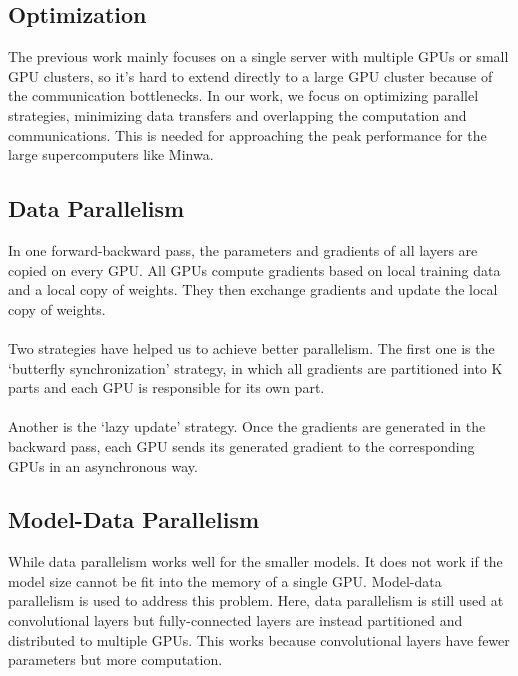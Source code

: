 \documentclass[12pt,letterpaper, onecolumn]{exam}
\begin{document}
    \subsection{Optimization }
    The previous work mainly focuses on a single server with multiple GPUs or small GPU clusters, so it's hard to extend directly to a large GPU cluster because of the communication bottlenecks. In our work, we focus on optimizing parallel strategies, minimizing data transfers and overlapping the computation and communications. This is needed for approaching the peak performance for the large supercomputers like Minwa. 
    
    \subsection{Data Parallelism}
    In one forward-backward pass, the parameters and gradients of all layers are copied on every GPU. All GPUs compute gradients based on local training data and a local copy of weights. They then exchange gradients and update the local copy of weights.\\
    \\
    Two strategies have helped us to achieve better parallelism. The first one is the ‘butterfly synchronization’ strategy, in which all gradients are partitioned into K parts and each GPU is responsible for its own part.\\\\
    Another is the ‘lazy update’ strategy. Once the gradients are generated in the backward pass, each GPU sends its generated gradient to the corresponding GPUs in an asynchronous way. 
    
    \subsection{Model-Data Parallelism}
    While data parallelism works well for the smaller models. It does not work if the model size cannot be fit into the memory of a single GPU. Model-data parallelism is used to address this problem. Here, data parallelism is still used at convolutional layers but fully-connected layers are instead partitioned and distributed to multiple GPUs. This works  because convolutional layers have fewer parameters but more computation. 
    
\end{document}
